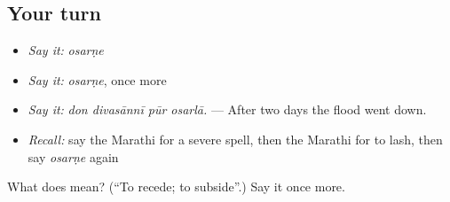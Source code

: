 \subsection*{Your turn}
\begin{itemize}
\raggedright
  \item \emph{Say it:} \emph{osarṇe}
  \item \emph{Say it:} \emph{osarṇe}, once more
  \item \emph{Say it:} \emph{don divasānnī pūr osarlā.} — After two days the flood went down.
  \item \emph{Recall:} say the Marathi for a severe spell, then the Marathi for to lash, then say \emph{osarṇe} again
\end{itemize}

\begin{tcolorbox}[breakable,colback=teal!4,colframe=teal!35!black,title={Before you move on}]
What does  mean? (\textquotedblleft{}To recede; to subside\textquotedblright{}.) Say it once more.
\end{tcolorbox}
